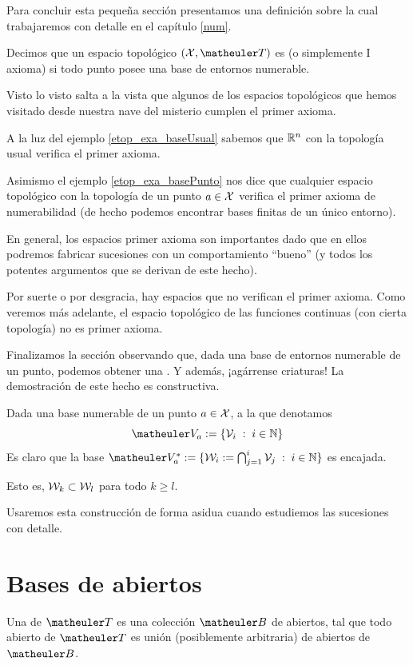 Para concluir esta pequeña sección presentamos una definición sobre la cual trabajaremos con detalle en el capítulo \ref{num}.

\begin{defi}
	Decimos que un espacio topológico $(\X,\T)$ es  (o simplemente I axioma) si todo punto posee una base de entornos numerable.
\end{defi}
Visto lo visto salta a la vista que algunos de los espacios topológicos que hemos visitado desde nuestra nave del misterio cumplen el primer axioma.
\begin{exa}
	A la luz del ejemplo \ref{etop_exa_baseUsual} sabemos que $\mathbb{R}^n$ con la topología usual verifica el primer axioma.
	
	Asimismo el ejemplo \ref{etop_exa_basePunto} nos dice que cualquier espacio topológico con la topología de un punto $a\in\mathcal{X}$ verifica el primer axioma de numerabilidad (de hecho podemos encontrar bases finitas de un único entorno).
\end{exa}
En general, los espacios primer axioma son importantes dado que en ellos podremos fabricar sucesiones con un comportamiento ``bueno'' (y todos los potentes argumentos que se derivan de este hecho).

Por suerte o por desgracia, hay espacios que no verifican el primer axioma. Como veremos más adelante, el espacio topológico de las funciones continuas (con cierta topología) no es primer axioma.

Finalizamos la sección observando que, dada una base de entornos numerable de un punto, podemos obtener una . Y además, ¡agárrense criaturas! La demostración de este hecho es constructiva.
\begin{obs}
	\label{etop_obs_base_encajada}
	Dada una base numerable de un punto $a\in\mathcal{X}$, a la que denotamos
	\begin{equation*}
		\Va{a}:=\{\V_i\midc i\in\N\}
	\end{equation*}
	Es claro que la base $\Va{a}^*:=\{\W_i:=\bigcap_{j=1}^i\V_j\midc i\in\N\}$ es encajada.
	
	Esto es, $\mathcal{W}_k\subset\mathcal{W}_l$ para todo $k\geq l$.
\end{obs}
Usaremos esta construcción de forma asidua cuando estudiemos las sucesiones con detalle.
\section{Bases de abiertos}
\begin{defi}
	\label{etop_bases_abiertos}
	Una  de $\T$ es una colección $\B$ de abiertos, tal que todo abierto de $\T$ es unión (posiblemente arbitraria) de abiertos de $\B$.
\end{defi}

